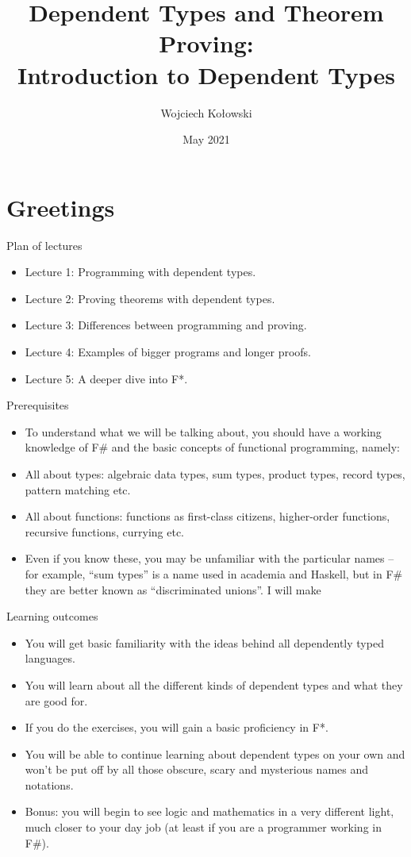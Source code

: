 \documentclass{beamer}
\title{Dependent Types and Theorem Proving: \\Introduction to Dependent Types}
\author{Wojciech Kołowski}
\date{May 2021}
\begin{document}
\frame{\titlepage}

\section{Greetings}

\begin{frame}{Plan of lectures}
\begin{itemize}
	\item Lecture 1: Programming with dependent types.
	\item Lecture 2: Proving theorems with dependent types.
	\item Lecture 3: Differences between programming and proving.
	\item Lecture 4: Examples of bigger programs and longer proofs.
	\item Lecture 5: A deeper dive into F*.
\end{itemize}
\end{frame}

\begin{frame}{Prerequisites}
\begin{itemize}
	\item To understand what we will be talking about, you should have a working knowledge of F\# and the basic concepts of functional programming, namely:
	\item All about types: algebraic data types, sum types, product types, record types, pattern matching etc.
	\item All about functions: functions as first-class citizens, higher-order functions, recursive functions, currying etc.
	\item Even if you know these, you may be unfamiliar with the particular names -- for example, ``sum types'' is a name used in academia and Haskell, but in F\# they are better known as ``discriminated unions''. I will make 
\end{itemize}
\end{frame}

\begin{frame}{Learning outcomes}
\begin{itemize}
	\item You will get basic familiarity with the ideas behind all dependently typed languages.
	\item You will learn about all the different kinds of dependent types and what they are good for.
	\item If you do the exercises, you will gain a basic proficiency in F*.
	\item You will be able to continue learning about dependent types on your own and won't be put off by all those obscure, scary and mysterious names and notations.
	\item Bonus: you will begin to see logic and mathematics in a very different light, much closer to your day job (at least if you are a programmer working in F\#).
\end{itemize}
\end{frame}
\end{document}

